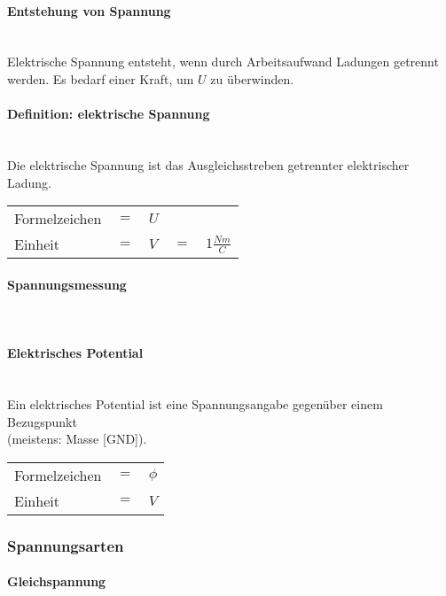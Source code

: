 		\paragraph{Entstehung von Spannung}~\\
		
\noindent Elektrische Spannung entsteht, wenn durch Arbeitsaufwand Ladungen getrennt werden. Es bedarf einer Kraft, um $U$ zu überwinden.
		
		\paragraph{Definition: elektrische Spannung}~\\

\noindent Die elektrische Spannung ist das Ausgleichsstreben getrennter elektrischer Ladung.

\begin{tabular}{lllll}
Formelzeichen	& $=$ & $U$ & & \\
Einheit			& $=$ & $V$ & $=$ & $1\frac{Nm}{C}$ \\
\end{tabular}	
		
		\paragraph{Spannungsmessung}~\\
		\paragraph{Elektrisches Potential}~\\
		
\noindent Ein elektrisches Potential ist eine Spannungsangabe gegenüber einem Bezugspunkt\\(meistens: Masse [GND]).

\begin{tabular}{lll}
Formelzeichen	& $=$ & $\phi$ \\
Einheit			& $=$ & $V$ \\
\end{tabular}	
		
	\subsubsection{Spannungsarten}
		\paragraph{Gleichspannung}~\\
